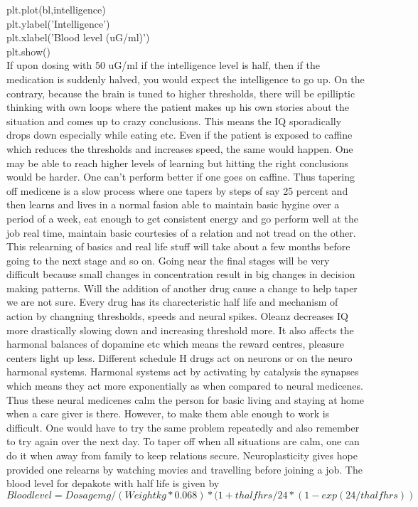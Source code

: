\documentclass[a4paper]{article}
\begin{document}
plt.plot(bl,intelligence)\\
plt.ylabel('Intelligence')\\
plt.xlabel('Blood level (uG/ml)')\\
plt.show()\\

If upon dosing with 50 uG/ml if the intelligence level is half, then if the medication is suddenly halved,
you would expect the intelligence to go up. On the contrary, because the brain is tuned to higher thresholds, there will be epilliptic thinking with own loops where the patient makes up his own stories about the situation and comes up to crazy conclusions. This means the IQ sporadically drops down especially while eating etc. Even if the patient is exposed to caffine which reduces the thresholds and increases speed, the same would happen. One may be able to reach higher levels of learning but hitting the right conclusions would be harder. One can't perform better if one goes on caffine. Thus tapering off medicene is a slow process where one tapers by steps of say 25 percent and then learns and lives in a normal fasion able to maintain basic hygine over a period of a week, eat enough to get consistent energy and go perform well at the job real time, maintain basic courtesies of a relation and not tread on the other. This relearning of basics and real life stuff will take about a few months before going to the next stage and so on. Going near the final stages will be very difficult because small changes in concentration result in big changes in decision making patterns. Will the addition of another drug cause a change to help taper we are not sure. Every drug has its charecteristic half life and mechanism of action by changning thresholds, speeds and neural spikes. Oleanz decreases IQ more drastically slowing down and increasing threshold more. It also affects the harmonal balances of dopamine etc which means the reward centres, pleasure centers light up less. Different schedule H drugs act on neurons or on the neuro harmonal systems. Harmonal systems act by activating by catalysis the synapses which means they act more exponentially as when compared to neural medicenes. Thus these neural medicenes calm the person for basic living and staying at home when a care giver is there. However, to make them able enough to work is difficult. One would have to try the same problem repeatedly and also remember to try again over the next day. To taper off when all situations are calm, one can do it when away from family to keep relations secure. Neuroplasticity gives hope provided one relearns by watching movies and travelling before joining a job. The blood level for depakote with half life is given by
$$Bloodlevel=Dosagemg/(Weightkg*0.068)*(1+thalfhrs/24*(1-exp(24/thalfhrs))$$
\end{document}
